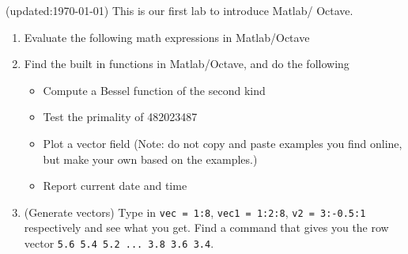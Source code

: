 \documentclass[12pt]{article}
\begin{document}
(updated:\today) This is our first lab to introduce Matlab/ Octave.

\begin{enumerate}
\item Evaluate the following math expressions in Matlab/Octave
\begin{itemize}
\end{itemize}
\item Find the built in functions in Matlab/Octave, and do the following 

\begin{itemize}
\item Compute a Bessel function of the second kind 
\item Test the primality of 482023487
\item Plot a vector field (Note: do not copy and paste examples you find online, but make your own based on the examples.) 
\item Report current date and time

\end{itemize}

\item (Generate vectors) Type in {\tt vec = 1:8}, {\tt vec1 = 1:2:8}, {\tt v2 = 3:-0.5:1} respectively and see what you get. Find a command that gives you the row vector {\tt 5.6 5.4 5.2 ... 3.8 3.6 3.4}.


\end{enumerate}
\end{document}
